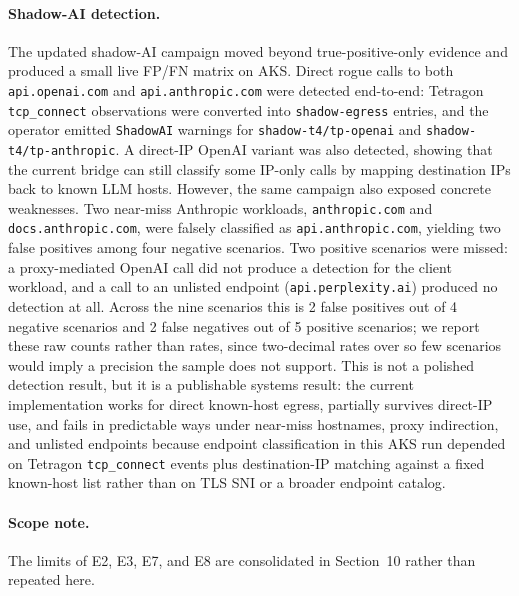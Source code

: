 \paragraph{Shadow-AI detection.}
The updated shadow-AI campaign moved beyond true-positive-only evidence and produced a small live FP/FN matrix on AKS. Direct rogue calls to both \texttt{api.openai.com} and \texttt{api.anthropic.com} were detected end-to-end: Tetragon \texttt{tcp\_connect} observations were converted into \texttt{shadow-egress} entries, and the operator emitted \texttt{ShadowAI} warnings for \texttt{shadow-t4/tp-openai} and \texttt{shadow-t4/tp-anthropic}. A direct-IP OpenAI variant was also detected, showing that the current bridge can still classify some IP-only calls by mapping destination IPs back to known LLM hosts. However, the same campaign also exposed concrete weaknesses. Two near-miss Anthropic workloads, \texttt{anthropic.com} and \texttt{docs.anthropic.com}, were falsely classified as \texttt{api.anthropic.com}, yielding two false positives among four negative scenarios. Two positive scenarios were missed: a proxy-mediated OpenAI call did not produce a detection for the client workload, and a call to an unlisted endpoint (\texttt{api.perplexity.ai}) produced no detection at all. Across the nine scenarios this is 2 false positives out of 4 negative scenarios and 2 false negatives out of 5 positive scenarios; we report these raw counts rather than rates, since two-decimal rates over so few scenarios would imply a precision the sample does not support. This is not a polished detection result, but it is a publishable systems result: the current implementation works for direct known-host egress, partially survives direct-IP use, and fails in predictable ways under near-miss hostnames, proxy indirection, and unlisted endpoints because endpoint classification in this AKS run depended on Tetragon \texttt{tcp\_connect} events plus destination-IP matching against a fixed known-host list rather than on TLS SNI or a broader endpoint catalog.

\paragraph{Scope note.}
The limits of E2, E3, E7, and E8 are consolidated in Section~10 rather than repeated here.
